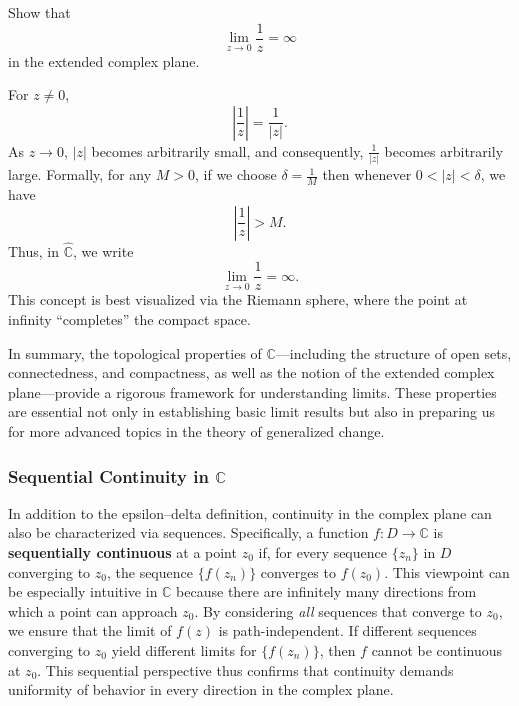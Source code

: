 \exampleline
\begin{example}
Show that
\[
\lim_{z \to 0} \frac{1}{z} = \infty
\]
in the extended complex plane.
\begin{solution}
For \(z \neq 0\),
\[
\left|\frac{1}{z}\right| = \frac{1}{|z|}.
\]
As \(z \to 0\), \(|z|\) becomes arbitrarily small, and consequently, \(\frac{1}{|z|}\) becomes arbitrarily large. Formally, for any \(M > 0\), if we choose \(\delta = \frac{1}{M}\) then whenever \(0 < |z| < \delta\), we have
\[
\left|\frac{1}{z}\right| > M.
\]
Thus, in \(\hat{\mathbb{C}}\), we write
\[
\lim_{z \to 0} \frac{1}{z} = \infty.
\]
This concept is best visualized via the Riemann sphere, where the point at infinity “completes” the compact space.
\end{solution}
\end{example}
\exampleline

\noindent In summary, the topological properties of \(\mathbb{C}\)—including the structure of open sets, connectedness, and compactness, as well as the notion of the extended complex plane—provide a rigorous framework for understanding limits. These properties are essential not only in establishing basic limit results but also in preparing us for more advanced topics in the theory of generalized change.

\subsubsection*{Sequential Continuity in \(\mathbb{C}\)}

\noindent In addition to the epsilon–delta definition, continuity in the complex plane can also be characterized via sequences. Specifically, a function \(f: D \to \mathbb{C}\) is \textbf{sequentially continuous} at a point \(z_0\) if, for every sequence \(\{z_n\}\) in \(D\) converging to \(z_0\), the sequence \(\{f(z_n)\}\) converges to \(f(z_0)\). This viewpoint can be especially intuitive in \(\mathbb{C}\) because there are infinitely many directions from which a point can approach \(z_0\). By considering \emph{all} sequences that converge to \(z_0\), we ensure that the limit of \(f(z)\) is path-independent. If different sequences converging to \(z_0\) yield different limits for \(\{f(z_n)\}\), then \(f\) cannot be continuous at \(z_0\). This sequential perspective thus confirms that continuity demands uniformity of behavior in every direction in the complex plane.


